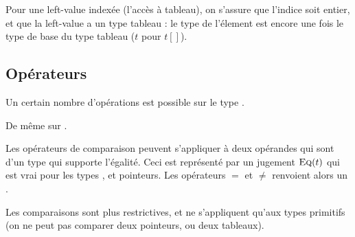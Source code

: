 \begin{mathpar}
\end{mathpar}

Pour une left-value indexée (l'accès à tableau), on s'assure que l'indice soit
entier, et que la left-value a un type tableau : le type de l'élement est encore
une fois le type de base du type tableau ($t$ pour $t[]$).

\begin{mathpar}
\end{mathpar}

\begin{mathpar}
\end{mathpar}


\subsection*{Opérateurs}

Un certain nombre d'opérations est possible sur le type \tInt.

\begin{mathpar}
\end{mathpar}

De même sur \tFloat.

\begin{mathpar}
\end{mathpar}

Les opérateurs de comparaison peuvent s'appliquer à deux opérandes qui sont d'un
type qui supporte l'égalité. Ceci est représenté par un jugement
$\textsc{Eq}(t)$ qui est vrai pour les types \tInt, \tFloat et pointeurs. Les
opérateurs $=$ et $≠$ renvoient alors un \tInt.

\begin{mathpar}



\end{mathpar}


Les comparaisons sont plus restrictives, et ne s'appliquent qu'aux types
primitifs (on ne peut pas comparer deux pointeurs, ou deux tableaux).

\begin{mathpar}
\end{mathpar}

